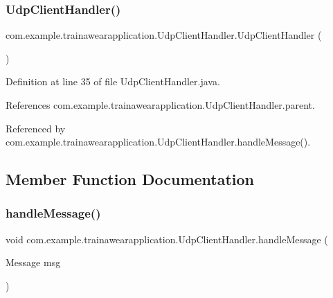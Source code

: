 \subsubsection{\texorpdfstring{UdpClientHandler()}{UdpClientHandler()}}
{\footnotesize\ttfamily com.\+example.\+trainawearapplication.\+Udp\+Client\+Handler.\+Udp\+Client\+Handler (\begin{DoxyParamCaption}{ }\end{DoxyParamCaption})}



Definition at line 35 of file Udp\+Client\+Handler.\+java.


\begin{DoxyCode}{0}

\end{DoxyCode}


References com.\+example.\+trainawearapplication.\+Udp\+Client\+Handler.\+parent.



Referenced by com.\+example.\+trainawearapplication.\+Udp\+Client\+Handler.\+handle\+Message().



\subsection{Member Function Documentation}
\mbox{\label{classcom_1_1example_1_1trainawearapplication_1_1_udp_client_handler_a433f624fad2243aaed2e97f7f3cb8434}} 
\subsubsection{\texorpdfstring{handleMessage()}{handleMessage()}}
{\footnotesize\ttfamily void com.\+example.\+trainawearapplication.\+Udp\+Client\+Handler.\+handle\+Message (\begin{DoxyParamCaption}\item[{Message}]{msg }\end{DoxyParamCaption})}



